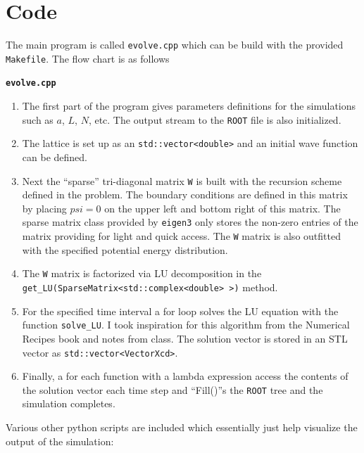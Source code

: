 \documentclass[singlepage,notitlepage,nofootinbib,11pt]{revtex4-1}
\begin{document}
\section*{Code}
The main program is called \texttt{evolve.cpp} which can be build with the provided \texttt{Makefile}. The flow chart is as follows
\begin{center}{\bf \texttt{evolve.cpp}}\end{center}
\begin{enumerate}
\item  The first part of the program gives parameters definitions for the simulations such as $a$, $L$, $N$, etc. The output stream to the \texttt{ROOT} file is also initialized.
\item The lattice is set up as an \texttt{std::vector<double>} and an initial wave function can be defined.
\item Next the ``sparse'' tri-diagonal matrix \texttt{W} is built with the recursion scheme defined in the problem. The boundary conditions are defined in this matrix by placing $psi=0$ on the upper left and bottom right of this matrix. The sparse matrix class provided by \texttt{eigen3} only stores the non-zero entries of the matrix providing for light and quick access. The \texttt{W} matrix is also outfitted with the specified potential energy distribution.
\item The \texttt{W} matrix is factorized via LU decomposition in the\\ \texttt{get\_LU(SparseMatrix<std::complex<double> >)} method.
\item For the specified time interval a for loop solves the LU equation with the function \texttt{solve\_LU}. I took inspiration for this algorithm from the Numerical Recipes book and notes from class. The solution vector is stored in an STL vector as \texttt{std::vector<VectorXcd>}.
  \item Finally, a for each function with a lambda expression access the contents of the solution vector each time step and ``Fill()''s the \texttt{ROOT} tree and the simulation completes.
\end{enumerate}
Various other python scripts are included which essentially just help visualize the output of the simulation:
\end{document}
